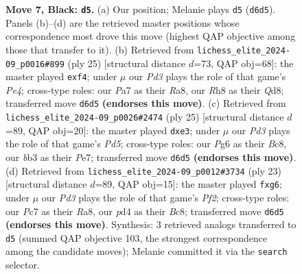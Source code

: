 \documentclass[11pt]{article}
\begin{document}
\begin{figure}[p]
\caption{\textbf{Move 7, Black: \texttt{d5}.} (a) Our position; Melanie plays \texttt{d5} (\texttt{d6d5}). Panels (b)--(d) are the retrieved master positions whose correspondence most drove this move (highest QAP objective among those that transfer to it). (b) Retrieved from \texttt{lichess\_elite\_2024-09\_p0016\#899} (ply 25) [structural distance $d$=73, QAP obj=68]: the master played \texttt{exf4}; under $\mu$ our \emph{Pd3} plays the role of that game's \emph{Pe4}; cross-type roles: our \emph{P}a7 as their \emph{R}a8, our \emph{R}h8 as their \emph{Q}d8; transferred move \texttt{d6d5} \textbf{(endorses this move)}. (c) Retrieved from \texttt{lichess\_elite\_2024-09\_p0026\#2474} (ply 25) [structural distance $d$=89, QAP obj=20]: the master played \texttt{dxe3}; under $\mu$ our \emph{Pd3} plays the role of that game's \emph{Pd5}; cross-type roles: our \emph{P}g6 as their \emph{B}c8, our \emph{b}b3 as their \emph{P}e7; transferred move \texttt{d6d5} \textbf{(endorses this move)}. (d) Retrieved from \texttt{lichess\_elite\_2024-09\_p0012\#3734} (ply 23) [structural distance $d$=89, QAP obj=15]: the master played \texttt{fxg6}; under $\mu$ our \emph{Pd3} plays the role of that game's \emph{Pf2}; cross-type roles: our \emph{P}c7 as their \emph{R}a8, our \emph{p}d4 as their \emph{B}c8; transferred move \texttt{d6d5} \textbf{(endorses this move)}. Synthesis: 3 retrieved analogs transferred to \texttt{d5} (summed QAP objective 103, the strongest correspondence among the candidate moves); Melanie committed it via the \texttt{search} selector.}
\label{fig:thought-m13}
\end{figure}

\clearpage
\end{document}

